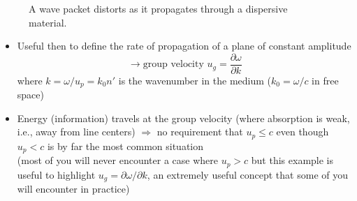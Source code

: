 \documentclass[11pt, oneside]{article}
\begin{document}

\begin{figure}[!htbp]
	\centering
	\caption{A wave packet distorts as it propagates through a dispersive material.}
	\label{f:packet}
\end{figure}

\begin{itemize}
	\item Useful then to define the rate of propagation of a plane of constant amplitude
	\begin{equation}
		\label{e:ug}
		\rightarrow \text{group velocity } u_g = \frac{\partial\omega}{\partial k}
	\end{equation}
	where $k = \omega/u_p = k_0n'$ is the wavenumber in the medium ($k_0 = \omega/c$ in free space)
	\item Energy (information) travels at the group velocity (where absorption is weak, i.e., away from line centers) $\Rightarrow$ no requirement that $u_p \le c$ even though $u_p < c$ is by far the most common situation\\
	(most of you will never encounter a case where $u_p > c$ but this example is useful to highlight $u_g = \partial\omega/\partial k$, an extremely useful concept that some of you will encounter in practice)
\end{itemize}
\end{document}
